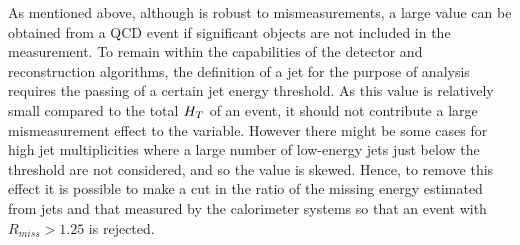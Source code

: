 As mentioned above, although \alt is robust to mismeasurements, a large value can be obtained from a QCD event if significant objects are not included in the measurement. To remain within the capabilities of the detector and reconstruction algorithms, the definition of a jet for the purpose of analysis requires the passing of a certain jet energy threshold. As this value is relatively small compared to the total $H_{T}$ of an event, it should not contribute a large mismeasurement effect to the \alt variable. However there might be some cases for high jet multiplicities where a large number of low-energy jets just below the threshold are not considered, and so the \alt value is skewed. Hence, to remove this effect it is possible to make a cut in the ratio of the missing energy estimated from jets \mht and that measured by the calorimeter systems \met so that an event with $R_{miss} > 1.25$ is rejected. 

